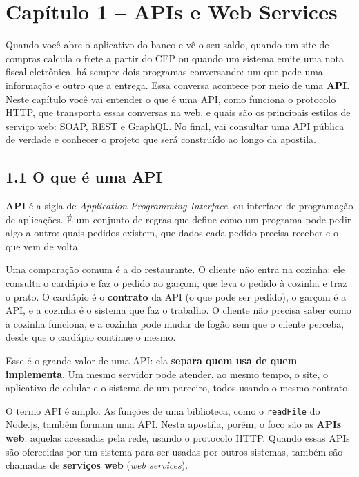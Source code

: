 \section{Capítulo 1 -- APIs e Web Services}

Quando você abre o aplicativo do banco e vê o seu saldo, quando um site de compras calcula o frete a partir do CEP ou quando um sistema emite uma nota fiscal eletrônica, há sempre dois programas conversando: um que pede uma informação e outro que a entrega. Essa conversa acontece por meio de uma \textbf{API}. Neste capítulo você vai entender o que é uma API, como funciona o protocolo HTTP, que transporta essas conversas na web, e quais são os principais estilos de serviço web: SOAP, REST e GraphQL. No final, vai consultar uma API pública de verdade e conhecer o projeto que será construído ao longo da apostila.

\subsection{1.1 O que é uma API}

\textbf{API} é a sigla de \textit{Application Programming Interface}, ou interface de programação de aplicações. É um conjunto de regras que define como um programa pode pedir algo a outro: quais pedidos existem, que dados cada pedido precisa receber e o que vem de volta.

Uma comparação comum é a do restaurante. O cliente não entra na cozinha: ele consulta o cardápio e faz o pedido ao garçom, que leva o pedido à cozinha e traz o prato. O cardápio é o \textbf{contrato} da API (o que pode ser pedido), o garçom é a API, e a cozinha é o sistema que faz o trabalho. O cliente não precisa saber como a cozinha funciona, e a cozinha pode mudar de fogão sem que o cliente perceba, desde que o cardápio continue o mesmo.

Esse é o grande valor de uma API: ela \textbf{separa quem usa de quem implementa}. Um mesmo servidor pode atender, ao mesmo tempo, o site, o aplicativo de celular e o sistema de um parceiro, todos usando o mesmo contrato.

O termo API é amplo. As funções de uma biblioteca, como o \texttt{readFile} do Node.js, também formam uma API. Nesta apostila, porém, o foco são as \textbf{APIs web}: aquelas acessadas pela rede, usando o protocolo HTTP. Quando essas APIs são oferecidas por um sistema para ser usadas por outros sistemas, também são chamadas de \textbf{serviços web} (\textit{web services}).


